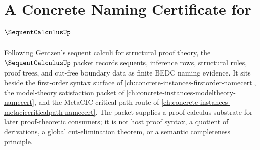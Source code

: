 \chapter{A Concrete Naming Certificate for $\SequentCalculusUp$}
\label{ch:concrete-instances-sequent-calculus-namecert}

Following Gentzen's sequent calculi for structural proof theory, the $\SequentCalculusUp$ packet records sequents, inference rows, structural rules, proof trees, and cut-free boundary data as finite BEDC naming evidence. It sits beside the first-order syntax surface of \autoref{ch:concrete-instances-firstorder-namecert}, the model-theory satisfaction packet of \autoref{ch:concrete-instances-modeltheory-namecert}, and the MetaCIC critical-path route of \autoref{ch:concrete-instances-metaciccriticalpath-namecert}. The packet supplies a proof-calculus substrate for later proof-theoretic consumers; it is not host proof syntax, a quotient of derivations, a global cut-elimination theorem, or a semantic completeness principle.

